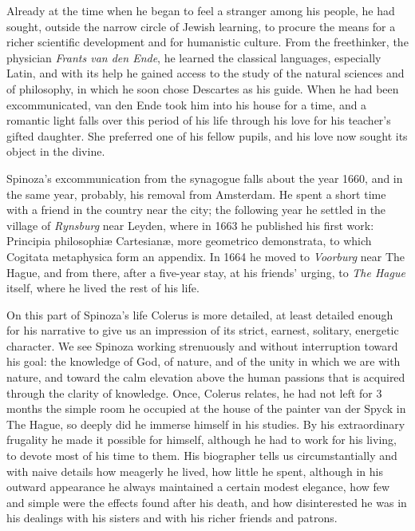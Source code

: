 \documentclass[12pt,a4paper,openany]{book}
\newcommand{\opage}[1]{\marginnote{\footnotesize\textit{[#1]}}}
\begin{document}
Already at the time when he began to feel a stranger among his people,
he had sought, outside the narrow circle of Jewish learning, to procure
the means for a richer scientific development and for humanistic
culture. From the freethinker, the physician \emph{Frants van den Ende},
he learned the classical languages, especially Latin, and with its help
he gained access to the study of the natural sciences and of philosophy,
in which he soon chose Descartes as his guide. When he had been
excommunicated, van den Ende took him into his house for a time, and a
romantic light falls over this period of his life through his love for
his teacher's gifted daughter. She preferred one of his fellow pupils,
and his love now sought its object in the divine.

Spinoza's excommunication from the synagogue falls about the year 1660,
and in the same year, probably, his removal from Amsterdam. He spent a
short time with a friend in the country near the city; the following
year he settled in the village of \emph{Rynsburg} near Leyden, where in
1663 he published his first work: Principia philosophiæ Cartesianæ, more
geometrico demonstrata, to which Cogitata metaphysica form an appendix.
In 1664 he moved to \emph{Voorburg} near The Hague, and from there,
after a five-year stay, at his friends' urging, to \emph{The Hague}
itself, where he lived the rest of his life.

\opage{31}On this part of Spinoza's life Colerus is more detailed, at least
detailed enough for his narrative to give us an impression of its
strict, earnest, solitary, energetic character. We see Spinoza working
strenuously and without interruption toward his goal: the knowledge of
God, of nature, and of the unity in which we are with nature, and toward
the calm elevation above the human passions that is acquired through
the clarity of knowledge. Once, Colerus relates, he had not left for 3
months the simple room he occupied at the house of the painter van der
Spyck in The Hague, so deeply did he immerse himself in his studies. By
his extraordinary frugality he made it possible for himself, although he
had to work for his living, to devote most of his time to them. His
biographer tells us circumstantially and with naive details how meagerly
he lived, how little he spent, although in his outward appearance he
always maintained a certain modest elegance, how few and simple were the
effects found after his death, and how disinterested he was in his
dealings with his sisters and with his richer friends and patrons.
\end{document}
